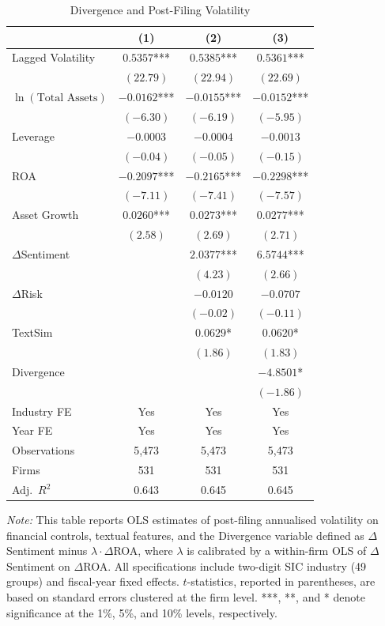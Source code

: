 \begin{table}[htbp]
\centering
\caption{Divergence and Post-Filing Volatility}
\label{tab:divergence_regression}
\begin{tabular}{lccc}
\toprule
 & (1) & (2) & (3) \\
\midrule
Lagged Volatility & $0.5357$*** & $0.5385$*** & $0.5361$*** \\
 & $(22.79)$ & $(22.94)$ & $(22.69)$ \\[4pt]
$\ln(\text{Total Assets})$ & $-0.0162$*** & $-0.0155$*** & $-0.0152$*** \\
 & $(-6.30)$ & $(-6.19)$ & $(-5.95)$ \\[4pt]
Leverage & $-0.0003$ & $-0.0004$ & $-0.0013$ \\
 & $(-0.04)$ & $(-0.05)$ & $(-0.15)$ \\[4pt]
ROA & $-0.2097$*** & $-0.2165$*** & $-0.2298$*** \\
 & $(-7.11)$ & $(-7.41)$ & $(-7.57)$ \\[4pt]
Asset Growth & $0.0260$*** & $0.0273$*** & $0.0277$*** \\
 & $(2.58)$ & $(2.69)$ & $(2.71)$ \\[4pt]
$\Delta$Sentiment &  & $2.0377$*** & $6.5744$*** \\
 &  & $(4.23)$ & $(2.66)$ \\[4pt]
$\Delta$Risk &  & $-0.0120$ & $-0.0707$ \\
 &  & $(-0.02)$ & $(-0.11)$ \\[4pt]
TextSim &  & $0.0629$* & $0.0620$* \\
 &  & $(1.86)$ & $(1.83)$ \\[4pt]
Divergence &  &  & $-4.8501$* \\
 &  &  & $(-1.86)$ \\[4pt]
\midrule
Industry FE & Yes & Yes & Yes \\
Year FE & Yes & Yes & Yes \\
Observations & 5,473 & 5,473 & 5,473 \\
Firms & 531 & 531 & 531 \\
Adj.\ $R^2$ & 0.643 & 0.645 & 0.645 \\
\bottomrule
\end{tabular}
\begin{tablenotes}
\item \textit{Note:} This table reports OLS estimates of post-filing annualised volatility on financial controls, textual features, and the Divergence variable defined as $\Delta$Sentiment minus $\lambda \cdot \Delta$ROA, where $\lambda$ is calibrated by a within-firm OLS of $\Delta$Sentiment on $\Delta$ROA. All specifications include two-digit SIC industry (49 groups) and fiscal-year fixed effects. $t$-statistics, reported in parentheses, are based on standard errors clustered at the firm level. ***, **, and * denote significance at the 1\%, 5\%, and 10\% levels, respectively.
\end{tablenotes}
\end{table}